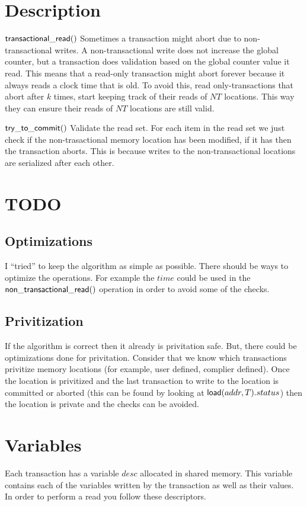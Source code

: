 \documentclass[11pt]{article}
\begin{document}
\section{Description}

{\bf ${\sf transactional\_read}()$}
Sometimes a transaction might abort due to non-transactional writes.
A non-transactional write does not increase the global counter, but a transaction does validation based on the
global counter value it read.
This means that a read-only transaction might abort forever because it always reads a clock time that is old.
To avoid this, read only-transactions that abort after $k$ times, start keeping track of their reads of $NT$ locations.
This way they can ensure their reads of $NT$ locations are still valid.

{\bf ${\sf try\_to\_commit}()$}
Validate the read set.
For each item in the read set we just check if the non-trasactional memory location has been modified, if it has then the transaction aborts.
This is because writes to the non-transactional locations are serialized after each other.

\section{TODO}
\subsection{Optimizations}
I ``tried'' to keep the algorithm as simple as possible.
There should be ways to optimize the operations.
For example the $time$ could be used in the ${\sf non\_transactional\_read}()$ operation
in order to avoid some of the checks.

\subsection{Privitization}
If the algorithm is correct then it already is privitation safe.
But, there could be optimizations done for privitation.
Consider that we know which transactions privitize memory locations (for example, user defined, complier defined).
Once the location is privitized and the last transaction to write to the location
is committed or aborted (this can be found by looking at ${\sf load}(addr, T).status$)
then the location is private and the checks can be avoided.

\section{Variables}
Each transaction has a variable $desc$ allocated in shared memory.
This variable contains each of the variables written by the transaction as well as their values.
In order to perform a read you follow these descriptors.
\end{document}
